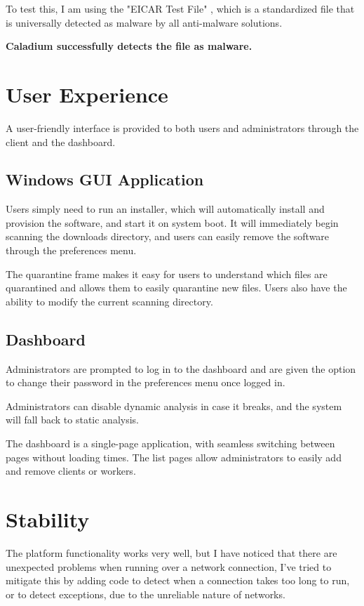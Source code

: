 To test this, I am using the "EICAR Test File" \cite{EICAR},
which is a standardized file that is universally
detected as malware by all anti-malware solutions.

\textbf{Caladium successfully detects the file as malware.}

\section{User Experience}
A user-friendly interface is provided to both users and
administrators through the client and the dashboard.

\subsection{Windows GUI Application}
Users simply need to run an installer,
which will automatically install and provision the software,
and start it on system boot.
It will immediately begin scanning the downloads directory,
and users can easily remove the software through the preferences menu.

The quarantine frame makes it easy for users to understand which
files are quarantined and allows them to easily quarantine new files.
Users also have the ability to modify the current scanning directory.

\subsection{Dashboard}
Administrators are prompted to log in to the dashboard and are
given the option to change their password in the
preferences menu once logged in.

Administrators can disable dynamic analysis in case it breaks,
and the system will fall back to static analysis.

The dashboard is a single-page application, with seamless switching
between pages without loading times.
The list pages allow administrators to easily add and remove clients or workers.

\section{Stability}
The platform functionality works very well, but I have noticed that there are unexpected problems when running over a network connection, I've tried to mitigate this by adding code to detect when a connection takes too long to run, or to detect exceptions, due to the unreliable nature of networks.

